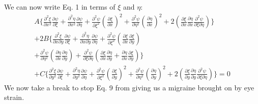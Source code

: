 \documentclass[a4paper,10pt]{article}
\numberwithin{equation}{section}
\begin{document}
We can now write Eq. 1 in terms of $\xi$ and $\eta$:
\begin{multline}
 A\{\frac{\partial ^2 \xi}{\partial x^2}\frac{\partial \psi}{\partial \xi}+\frac{\partial ^2 \eta}{\partial x^2}
\frac{\partial \psi}{\partial \eta}
+\frac{\partial ^2 \psi}{\partial \xi ^2}(\frac{\partial \xi}{\partial x})^2+\frac{\partial ^2 \psi}{\partial \eta ^2}(\frac{\partial \eta}{\partial x})^2
+2(\frac{\partial \xi}{\partial x}\frac{\partial \eta}{\partial x}\frac{\partial ^2 \psi}{\partial \xi \partial \eta})\}\\
+2B\{\frac{\partial ^2\xi}{\partial x \partial y}\frac{\partial \psi}{\partial \xi}
 +\frac{\partial ^2 \eta}{\partial x \partial y}\frac{\partial \psi}{\partial \eta}
 +\frac{\partial^2 \psi}{\partial \xi ^2}(\frac{\partial \xi}{\partial x}\frac{\partial \xi}{\partial y})\\
 +\frac{\partial^2 \psi}{\partial \eta ^2}(\frac{\partial \eta}{\partial x}\frac{\partial \eta}{\partial y})
 +\frac{\partial ^2 \psi}{\partial \xi \partial \eta}(\frac{\partial \xi}{\partial x}\frac{\partial \eta}{\partial y}+\frac{\partial \eta}{\partial x}\frac{\partial \xi}{\partial y} ) \}\\
 +C\{\frac{\partial ^2 \xi}{\partial y^2}\frac{\partial \psi}{\partial \xi}+\frac{\partial ^2 \eta}{\partial y^2}\frac{\partial \psi}{\partial \eta}
+\frac{\partial ^2 \psi}{\partial \xi ^2}(\frac{\partial \xi}{\partial y})^2+\frac{\partial ^2 \psi}{\partial \eta ^2}(\frac{\partial \eta}{\partial y})^2
+2(\frac{\partial \xi}{\partial y}\frac{\partial \eta}{\partial y}\frac{\partial ^2 \psi}{\partial \xi \partial \eta}) \}=0
\end{multline}
We now take a break to stop Eq. 9 from giving us a migraine brought on by eye strain.
\end{document}
